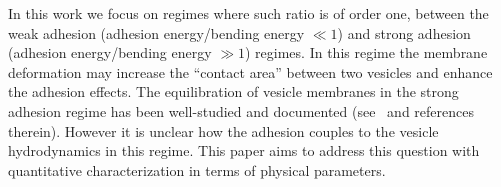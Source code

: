 \documentclass[prf,superscriptaddress,showkeys,longbibliography]{revtex4-1}
\begin{document}
In this work we focus on regimes where such ratio is of order one,
between the weak adhesion (adhesion energy/bending energy $\ll 1$) and
strong adhesion (adhesion energy/bending energy $\gg 1$) regimes.  In
this regime the membrane deformation may increase the ``contact area''
between two vesicles and enhance the adhesion effects.  The
equilibration of vesicle membranes in the strong adhesion regime has
been well-studied and documented
(see~\cite{Agrawal2011_MathMechSolids,RamachandranAndersonLealIsraelachvili2010_Langmuir,
SteinkuhlerAgudo-Canalejo2016_BJ, FlormannAouane2017_SciReports} and
references therein). However it is unclear how the adhesion couples to
the vesicle hydrodynamics in this regime.  This paper aims to address
this question with quantitative characterization in terms of physical
parameters.

%
% 
% 
\end{document}
